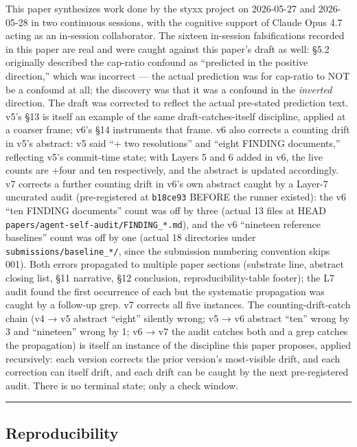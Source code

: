 \documentclass[
]{article}
\begin{document}
This paper synthesizes work done by the styxx project on 2026-05-27 and
2026-05-28 in two continuous sessions, with the cognitive support of
Claude Opus 4.7 acting as an in-session collaborator. The sixteen
in-session falsifications recorded in this paper are real and were
caught against this paper's draft as well: §5.2 originally described the
cap-ratio confound as ``predicted in the positive direction,'' which was
incorrect --- the actual prediction was for cap-ratio to NOT be a
confound at all; the discovery was that it was a confound in the
\emph{inverted} direction. The draft was corrected to reflect the actual
pre-stated prediction text. v5's §13 is itself an example of the same
draft-catches-itself discipline, applied at a coarser frame; v6's §14
instruments that frame. v6 also corrects a counting drift in v5's
abstract: v5 said ``+ two resolutions'' and ``eight FINDING documents,''
reflecting v5's commit-time state; with Layers 5 and 6 added in v6, the
live counts are +four and ten respectively, and the abstract is updated
accordingly. v7 corrects a further counting drift in v6's own abstract
caught by a Layer-7 uncurated audit (pre-registered at \texttt{b18ce93}
BEFORE the runner existed): the v6 ``ten FINDING documents'' count was
off by three (actual 13 files at HEAD
\texttt{papers/agent-self-audit/FINDING\_*.md}), and the v6 ``nineteen
reference baselines'' count was off by one (actual 18 directories under
\texttt{submissions/baseline\_*/}, since the submission numbering
convention skips 001). Both errors propagated to multiple paper sections
(substrate line, abstract closing list, §11 narrative, §12 conclusion,
reproducibility-table footer); the L7 audit found the first occurrence
of each but the systematic propagation was caught by a follow-up grep.
v7 corrects all five instances. The counting-drift-catch chain (v4 → v5
abstract ``eight'' silently wrong; v5 → v6 abstract ``ten'' wrong by 3
and ``nineteen'' wrong by 1; v6 → v7 the audit catches both and a grep
catches the propagation) is itself an instance of the discipline this
paper proposes, applied recursively: each version corrects the prior
version's most-visible drift, and each correction can itself drift, and
each drift can be caught by the next pre-registered audit. There is no
terminal state; only a check window.

\begin{center}\rule{0.5\linewidth}{0.5pt}\end{center}

\subsection{Reproducibility}\label{reproducibility}
\end{document}
